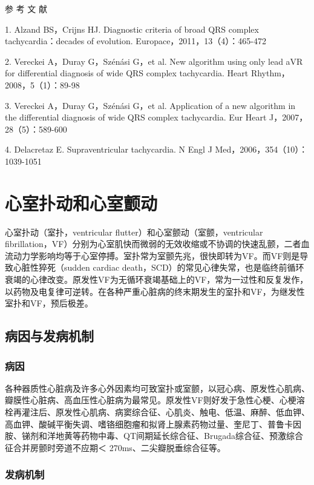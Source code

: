 \hypertarget{text00295.htmlux5cux23CHP10-2-8-4}{}
参 考 文 献

1. Alzand BS，Crijns HJ. Diagnostic criteria of broad QRS complex
tachycardia：decades of evolution. Europace，2011，13（4）：465-472

2. Vereckei A，Duray G，Szénási G，et al. New algorithm using only lead
aVR for differential diagnosis of wide QRS complex tachycardia. Heart
Rhythm，2008，5（1）：89-98

3. Vereckei A，Duray G，Szénási G，et al. Application of a new algorithm
in the differential diagnosis of wide QRS complex tachycardia. Eur Heart
J，2007，28（5）：589-600

4. Delacretaz E. Supraventricular tachycardia. N Engl J
Med，2006，354（10）：1039-1051

\protect\hypertarget{text00296.html}{}{}

\section{心室扑动和心室颤动}

心室扑动（室扑，ventricular flutter）和心室颤动（室颤，ventricular
fibrillation，VF）分别为心室肌快而微弱的无效收缩或不协调的快速乱颤，二者血流动力学影响均等于心室停搏。室扑常为室颤先兆，很快即转为VF。而VF则是导致心脏性猝死（sudden
cardiac
death，SCD）的常见心律失常，也是临终前循环衰竭的心律改变。原发性VF为无循环衰竭基础上的VF，常为一过性和反复发作，以药物及电复律可逆转。在各种严重心脏病的终末期发生的室扑和VF，为继发性室扑和VF，预后极差。

\subsection{病因与发病机制}

\subsubsection{病因}

各种器质性心脏病及许多心外因素均可致室扑或室颤，以冠心病、原发性心肌病、瓣膜性心脏病、高血压性心脏病为最常见。原发性VF则好发于急性心梗、心梗溶栓再灌注后、原发性心肌病、病窦综合征、心肌炎、触电、低温、麻醉、低血钾、高血钾、酸碱平衡失调、嗜铬细胞瘤和拟肾上腺素药物过量、奎尼丁、普鲁卡因胺、锑剂和洋地黄等药物中毒、QT间期延长综合征、Brugada综合征、预激综合征合并房颤时旁道不应期＜
270ms、二尖瓣脱垂综合征等。

\subsubsection{发病机制}

